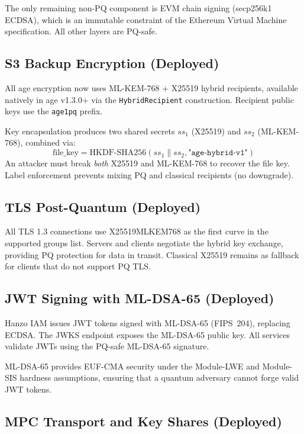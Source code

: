 \documentclass[11pt,a4paper]{article}
\begin{document}
\noindent The only remaining non-PQ component is EVM chain signing
(secp256k1 ECDSA), which is an immutable constraint of the Ethereum
Virtual Machine specification. All other layers are PQ-safe.

\subsection{S3 Backup Encryption (Deployed)}

All age encryption now uses ML-KEM-768 + X25519 hybrid recipients,
available natively in age v1.3.0+ via the \texttt{HybridRecipient}
construction. Recipient public keys use the \texttt{age1pq} prefix.

Key encapsulation produces two shared secrets $ss_1$ (X25519) and
$ss_2$ (ML-KEM-768), combined via:
\begin{equation}
  \text{file\_key} = \text{HKDF-SHA256}(ss_1 \| ss_2, \texttt{"age-hybrid-v1"})
\end{equation}
An attacker must break \emph{both} X25519 and ML-KEM-768 to recover
the file key. Label enforcement prevents mixing PQ and classical
recipients (no downgrade).

\subsection{TLS Post-Quantum (Deployed)}

All TLS 1.3 connections use X25519MLKEM768 as the first curve in the
supported groups list. Servers and clients negotiate the hybrid
key exchange, providing PQ protection for data in transit. Classical
X25519 remains as fallback for clients that do not support PQ TLS.

\subsection{JWT Signing with ML-DSA-65 (Deployed)}

Hanzo IAM issues JWT tokens signed with ML-DSA-65 (FIPS~204),
replacing ECDSA. The JWKS endpoint exposes the ML-DSA-65 public key.
All services validate JWTs using the PQ-safe ML-DSA-65 signature.

ML-DSA-65 provides EUF-CMA security under the Module-LWE and
Module-SIS hardness assumptions, ensuring that a quantum adversary
cannot forge valid JWT tokens.

\subsection{MPC Transport and Key Shares (Deployed)}
\end{document}
